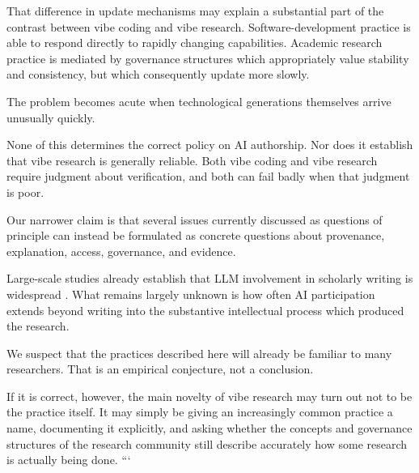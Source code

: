 That difference in update mechanisms may explain a substantial part of the contrast between vibe coding and vibe research. Software-development practice is able to respond directly to rapidly changing capabilities. Academic research practice is mediated by governance structures which appropriately value stability and consistency, but which consequently update more slowly.

The problem becomes acute when technological generations themselves arrive unusually quickly.

None of this determines the correct policy on AI authorship. Nor does it establish that vibe research is generally reliable. Both vibe coding and vibe research require judgment about verification, and both can fail badly when that judgment is poor.

Our narrower claim is that several issues currently discussed as questions of principle can instead be formulated as concrete questions about provenance, explanation, access, governance, and evidence.

Large-scale studies already establish that LLM involvement in scholarly writing is widespread \citep{liangEtAl2024mapping,kobakEtAl2024biomedical,gray2025prevalence}. What remains largely unknown is how often AI participation extends beyond writing into the substantive intellectual process which produced the research.

We suspect that the practices described here will already be familiar to many researchers. That is an empirical conjecture, not a conclusion.

If it is correct, however, the main novelty of vibe research may turn out not to be the practice itself. It may simply be giving an increasingly common practice a name, documenting it explicitly, and asking whether the concepts and governance structures of the research community still describe accurately how some research is actually being done.
```
